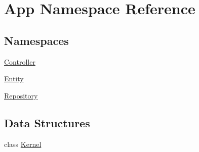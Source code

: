 \hypertarget{namespace_app}{}\section{App Namespace Reference}
\label{namespace_app}
\subsection*{Namespaces}
\begin{DoxyCompactItemize}
\item 
 \mbox{\hyperlink{namespace_app_1_1_controller}{Controller}}
\item 
 \mbox{\hyperlink{namespace_app_1_1_entity}{Entity}}
\item 
 \mbox{\hyperlink{namespace_app_1_1_repository}{Repository}}
\end{DoxyCompactItemize}
\subsection*{Data Structures}
\begin{DoxyCompactItemize}
\item 
class \mbox{\hyperlink{class_app_1_1_kernel}{Kernel}}
\end{DoxyCompactItemize}
